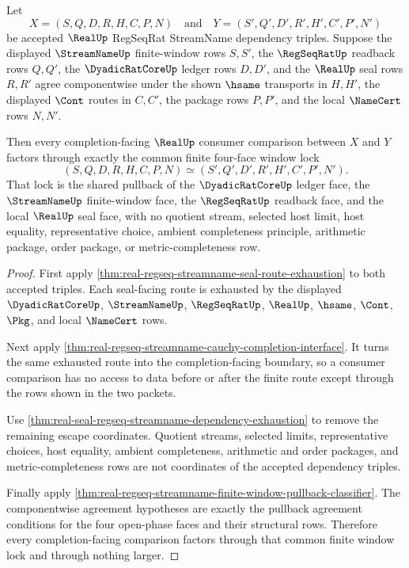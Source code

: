 \begin{theorem}
\label{thm:real-regseq-streamname-dyadic-window-lock}
Let
$$
X=(S,Q,D,R,H,C,P,N)
\quad\text{and}\quad
Y=(S',Q',D',R',H',C',P',N')
$$
be accepted $\RealUp$ RegSeqRat StreamName dependency triples. Suppose the
displayed $\StreamNameUp$ finite-window rows $S,S'$, the $\RegSeqRatUp$
readback rows $Q,Q'$, the $\DyadicRatCoreUp$ ledger rows $D,D'$, and the
$\RealUp$ seal rows $R,R'$ agree componentwise under the shown $\hsame$
transports in $H,H'$, the displayed $\Cont$ routes in $C,C'$, the package rows
$P,P'$, and the local $\NameCert$ rows $N,N'$.

Then every completion-facing $\RealUp$ consumer comparison between $X$ and $Y$
factors through exactly the common finite four-face window lock
$$
(S,Q,D,R,H,C,P,N)\simeq(S',Q',D',R',H',C',P',N').
$$
That lock is the shared pullback of the $\DyadicRatCoreUp$ ledger face, the
$\StreamNameUp$ finite-window face, the $\RegSeqRatUp$ readback face, and the
local $\RealUp$ seal face, with no quotient stream, selected host limit, host
equality, representative choice, ambient completeness principle,
arithmetic package, order package, or metric-completeness row.
\end{theorem}
\begin{proof}
First apply \autoref{thm:real-regseq-streamname-seal-route-exhaustion} to both
accepted triples. Each seal-facing route is exhausted by the displayed
$\DyadicRatCoreUp$, $\StreamNameUp$, $\RegSeqRatUp$, $\RealUp$, $\hsame$,
$\Cont$, $\Pkg$, and local $\NameCert$ rows.

Next apply \autoref{thm:real-regseq-streamname-cauchy-completion-interface}.
It turns the same exhausted route into the completion-facing boundary, so a
consumer comparison has no access to data before or after the finite route
except through the rows shown in the two packets.

Use \autoref{thm:real-seal-regseq-streamname-dependency-exhaustion} to remove
the remaining escape coordinates. Quotient streams, selected limits,
representative choices, host equality, ambient completeness, arithmetic and
order packages, and metric-completeness rows are not coordinates of the
accepted dependency triples.

Finally apply
\autoref{thm:real-regseq-streamname-finite-window-pullback-classifier}. The
componentwise agreement hypotheses are exactly the pullback agreement
conditions for the four open-phase faces and their structural rows. Therefore
every completion-facing comparison factors through that common finite window
lock and through nothing larger.
\end{proof}

